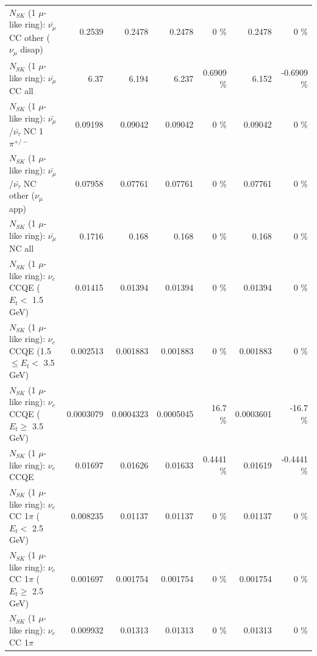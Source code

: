 \begin{table}
\begin{tabular}{| l | r | r | r  r | r  r |}
        $N_{SK}$ (1 $\mu$-like ring): $\bar{\nu_\mu}$ CC other ($\nu_\mu$ disap) &          0.2539 &          0.2478 &          0.2478 &        0 \%  &          0.2478 &        0 \%  \\ 
                          $N_{SK}$ (1 $\mu$-like ring): $\bar{\nu_{\mu}}$ CC all &            6.37 &           6.194 &           6.237 &   0.6909 \%  &           6.152 &  -0.6909 \%  \\ 
\hline
  $N_{SK}$ (1 $\mu$-like ring): $\bar{\nu_\mu}$/$\bar{\nu_\tau}$ NC 1$\pi^{+/-}$ &         0.09198 &         0.09042 &         0.09042 &        0 \%  &         0.09042 &        0 \%  \\ 
$N_{SK}$ (1 $\mu$-like ring): $\bar{\nu_\mu}$/$\bar{\nu_\tau}$ NC other ($\nu_\mu$ app) &         0.07958 &         0.07761 &         0.07761 &        0 \%  &         0.07761 &        0 \%  \\ 
                          $N_{SK}$ (1 $\mu$-like ring): $\bar{\nu_{\mu}}$ NC all &          0.1716 &           0.168 &           0.168 &        0 \%  &           0.168 &        0 \%  \\ 
\hline
\hline
\hline
                  $N_{SK}$ (1 $\mu$-like ring): $\nu_e$ CCQE ($E_{t} <$ 1.5 GeV) &         0.01415 &         0.01394 &         0.01394 &        0 \%  &         0.01394 &        0 \%  \\ 
         $N_{SK}$ (1 $\mu$-like ring): $\nu_e$ CCQE (1.5 $\leq E_{t} <$ 3.5 GeV) &        0.002513 &        0.001883 &        0.001883 &        0 \%  &        0.001883 &        0 \%  \\ 
               $N_{SK}$ (1 $\mu$-like ring): $\nu_e$ CCQE ($E_{t} \geq$ 3.5 GeV) &       0.0003079 &       0.0004323 &       0.0005045 &     16.7 \%  &       0.0003601 &    -16.7 \%  \\ 
\hline
                                      $N_{SK}$ (1 $\mu$-like ring): $\nu_e$ CCQE &         0.01697 &         0.01626 &         0.01633 &   0.4441 \%  &         0.01619 &  -0.4441 \%  \\ 
\hline
             $N_{SK}$ (1 $\mu$-like ring): $\nu_e$ CC 1$\pi$ ($E_{t} <$ 2.5 GeV) &        0.008235 &         0.01137 &         0.01137 &        0 \%  &         0.01137 &        0 \%  \\ 
          $N_{SK}$ (1 $\mu$-like ring): $\nu_e$ CC 1$\pi$ ($E_{t} \geq$ 2.5 GeV) &        0.001697 &        0.001754 &        0.001754 &        0 \%  &        0.001754 &        0 \%  \\ 
\hline
                                 $N_{SK}$ (1 $\mu$-like ring): $\nu_e$ CC 1$\pi$ &        0.009932 &         0.01313 &         0.01313 &        0 \%  &         0.01313 &        0 \%  \\ 

\end{tabular}
\end{table}
